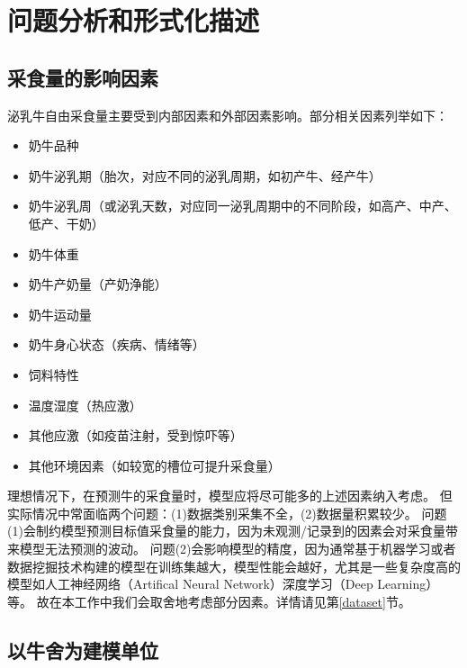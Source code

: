 \section{问题分析和形式化描述}
\label{analyze}

\subsection{采食量的影响因素}

泌乳牛自由采食量主要受到内部因素和外部因素影响。部分相关因素列举如下：


\begin{itemize}
\item
奶牛品种
\item
奶牛泌乳期（胎次，对应不同的泌乳周期，如初产牛、经产牛）
\item
 奶牛泌乳周（或泌乳天数，对应同一泌乳周期中的不同阶段，如高产、中产、低产、干奶）
\item
奶牛体重
\item
奶牛产奶量（产奶浄能）
\item
奶牛运动量
\item
奶牛身心状态（疾病、情绪等）
\end{itemize}

\begin{itemize}
\item
饲料特性
\item
温度湿度（热应激）
\item
其他应激（如疫苗注射，受到惊吓等）
\item
其他环境因素（如较宽的槽位可提升采食量）

\end{itemize}

理想情况下，在预测牛的采食量时，模型应将尽可能多的上述因素纳入考虑。
但实际情况中常面临两个问题：(1)数据类别采集不全，(2)数据量积累较少。
问题(1)会制约模型预测目标值采食量的能力，因为未观测/记录到的因素会对采食量带来模型无法预测的波动。
问题(2)会影响模型的精度，因为通常基于机器学习或者数据挖掘技术构建的模型在训练集越大，模型性能会越好，尤其是一些复杂度高的模型如人工神经网络（Artifical Neural Network）深度学习（Deep Learning）等。
故在本工作中我们会取舍地考虑部分因素。详情请见第\ref{dataset}节。

\subsection{以牛舍为建模单位}

